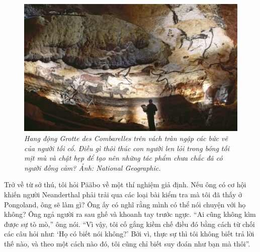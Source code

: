 \begin{multicols}{2}
	\begin{figure}[H]
		\vspace*{-5pt}
		\centering
		\captionsetup{labelformat= empty, justification=centering}
		\includegraphics[width= 1\linewidth]{5}
		\caption{\small\textit{\color{timhieukhoahoc}Hang động Grotte des Combarelles trên vách tràn ngập các bức vẽ của người tối cổ. Điều gì thôi thúc con người len lỏi trong bóng tối mịt mù và chật hẹp để tạo nên những tác phẩm chưa chắc đã có người đồng cảm? Ảnh: National Geographic.}}
		\vspace*{-10pt}
	\end{figure}
	Trở về từ sở thú, tôi hỏi Pääbo về một thí nghiệm giả định. Nếu ông có cơ hội khiến người Neanderthal phải trải qua các loại bài kiểm tra mà tôi đã thấy ở Pongoland, ông sẽ làm gì? Ông ấy có nghĩ rằng mình có thể nói chuyện với họ không? Ông ngả người ra sau ghế và khoanh tay trước ngực.
	\vskip 0.1cm
	“Ai cũng không kìm được sự tò mò,” ông nói. “Vì vậy, tôi cố gắng kiềm chế điều đó bằng cách từ chối các câu hỏi như: ‘Họ có biết nói không?’ Bởi vì, thực sự thì tôi không biết trả lời thế nào, và theo một cách nào đó, tôi cũng chỉ biết suy đoán như bạn mà thôi”.
	\vskip 0.1cm

\end{multicols}
